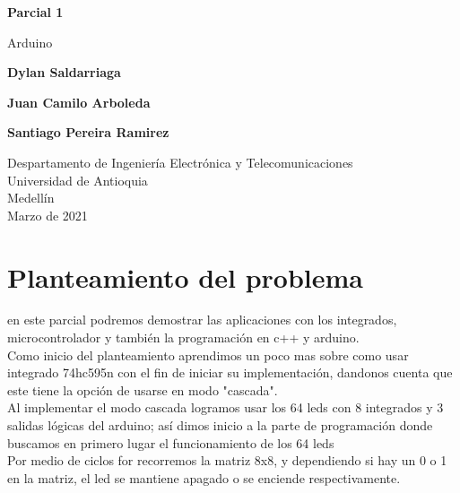 \documentclass{article}
\begin{document}
\begin{titlepage}
    \begin{center}
        \vspace*{1cm}
            
        \Huge
        \textbf{Parcial 1}
            
        \vspace{0.5cm}
        \LARGE
        Arduino
            
        \vspace{1.5cm}
            
        \textbf{Dylan Saldarriaga}
        
         \textbf{Juan Camilo Arboleda}
         
         \textbf{Santiago Pereira Ramirez}
       
        \vfill
            
        \vspace{0.8cm}
            
        \Large
        Despartamento de Ingeniería Electrónica y Telecomunicaciones\\
        Universidad de Antioquia\\
        Medellín\\
        Marzo de 2021
            
    \end{center}
\end{titlepage}

\tableofcontents
\newpage
\section{Planteamiento del problema}\label{intro}
en este parcial podremos demostrar las aplicaciones con los integrados, microcontrolador y también la programación en c++ y arduino.\\

Como inicio del planteamiento aprendimos un poco mas sobre como usar integrado 74hc595n con el fin de iniciar su implementación, dandonos cuenta que este tiene la opción de usarse en modo "cascada".\\

Al implementar el modo cascada logramos usar los 64 leds con 8 integrados y 3 salidas lógicas del arduino; así dimos inicio a la parte de programación donde buscamos en primero lugar el funcionamiento de los 64 leds\\

Por medio de ciclos for recorremos la matriz 8x8, y dependiendo si hay un 0 o 1 en la matriz, el led se mantiene apagado o se enciende respectivamente.
\end{document}
